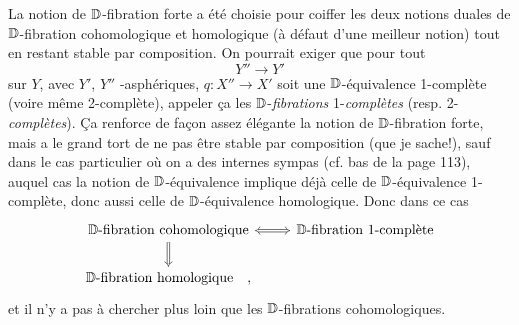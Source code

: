 La notion de $\mathbb{D}$-fibration forte a été choisie pour coiffer les deux notions duales de $\mathbb{D}$-fibration cohomologique et homologique (à défaut d'une meilleur notion) tout en restant stable par composition. On pourrait exiger que pour tout %
\[
Y'' \longrightarrow Y'
\]
sur $Y$, avec $Y'$, $Y''$ \Hot-asphériques, $q : X'' \to X'$ soit une $\mathbb{D}$-équivalence 1-complète (voire même 2-complète), appeler ça les $\mathbb{D}$-\textit{fibrations} 1-\textit{complètes} (resp. 2-\textit{complètes}). Ça renforce de façon assez élégante la notion de $\mathbb{D}$-fibration forte, mais a le grand tort de ne pas être stable par composition (que je sache!), sauf dans le cas particulier où on a des \underline{\Hom} internes sympas (cf. bas de la page 113), auquel cas la notion de $\mathbb{D}$-équivalence implique déjà celle de $\mathbb{D}$-équivalence 1-complète,
donc aussi celle de $\mathbb{D}$-équivalence homologique. Donc dans ce cas
\[
\begin{tikzcd}
\text{$\D$-fibration cohomologique} \arrow[r, Leftrightarrow] \arrow[d, Rightarrow] & \text{$\D$-fibration 1-complète} \\
\text{$\D$-fibration homologique} \quad , &
\end{tikzcd}
\]
et il n'y a pas à chercher plus loin que les $\mathbb{D}$-fibrations cohomologiques.

